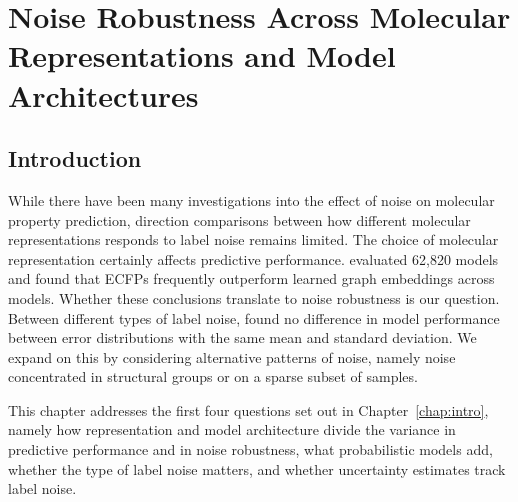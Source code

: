 \chapter{Noise Robustness Across Molecular Representations and Model Architectures}\label{chap:robustness}


\section{Introduction}


While there have been many investigations into the effect of noise on molecular property prediction, direction comparisons between how different molecular representations responds to label noise remains limited. The choice of molecular representation certainly affects predictive performance. \citet{Deng2023} evaluated 62,820 models and found that ECFPs frequently outperform learned graph embeddings across models. Whether these conclusions translate to noise robustness is our question. Between different types of label noise, \citet{Heid2023} found no difference in model performance between error distributions with the same mean and standard deviation. We expand on this by considering alternative patterns of noise, namely noise concentrated in structural groups or on a sparse subset of samples.

This chapter addresses the first four questions set out in Chapter~\ref{chap:intro}, namely how representation and model architecture divide the variance in predictive performance and in noise robustness, what probabilistic models add, whether the type of label noise matters, and whether uncertainty estimates track label noise.

